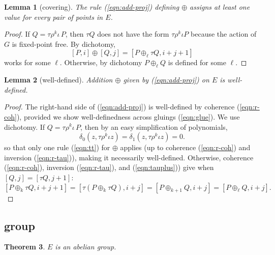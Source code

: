 \documentclass[12pt]{article}
\newtheorem{theorem}{Theorem}[subsection]
\newtheorem{lemma}[theorem]{Lemma}
\begin{document}
\begin{lemma}[covering] The rule (\ref{eqn:add-proj}) defining
  $\oplus$ assigns at least one value for every pair of points in $E$.
\end{lemma}

\begin{proof} If $Q=\tau \rho^k \iota\,P$, then $\tau Q$ does not have
  the form $\tau\rho^k\iota P$ because the action of $G$ is
  fixed-point free.  By dichotomy,
\begin{equation}\label{eqn:tt}
[P,i]\oplus [Q,j] = [P\oplus_\ell \tau Q,i+j+1]
\end{equation}
works for some $\ell$.  Otherwise, by dichotomy $P\oplus_\ell Q$ is
defined for some $\ell$.
\end{proof}

\begin{lemma}[well-defined] Addition $\oplus$ given by
  (\ref{eqn:add-proj}) on $E$ is well-defined.
\end{lemma}

\begin{proof}
  The right-hand side of (\ref{eqn:add-proj}) is well-defined by
  coherence (\ref{eqn:r-coh}), provided we show well-definedness
  across gluings (\ref{eqn:glue}).  We use dichotomy.  If $Q=\tau
  \rho^k \iota\,P$, then by an easy simplification of polynomials,
\[
\delta_0(z,\tau\rho^k\iota z)=\delta_1(z,\tau\rho^k\iota z)=0.
\]
so that only one rule (\ref{eqn:tt}) for $\oplus$ applies (up to
coherence (\ref{eqn:r-coh}) and inversion (\ref{eqn:r-tau})), making
it necessarily well-defined.  Otherwise, coherence (\ref{eqn:r-coh}),
inversion (\ref{eqn:r-tau}), and (\ref{eqn:tauplus})) give when
$[Q,j]=[\tau Q,j+1]$:
 \[ 
[P\oplus_k \tau Q,i+j+1]=[\tau(P\oplus_k \tau Q),i+j] =
 [P\oplus_{k+1} Q,i+j] = [P\oplus_\ell Q,i+j].
\]
\end{proof}

\subsection{group}

\begin{theorem}  $E$ is an abelian group.
\end{theorem}
\end{document}
